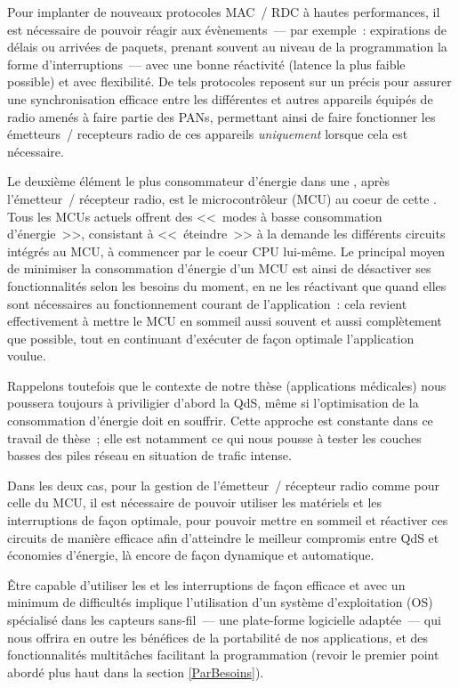 Pour implanter de nouveaux protocoles MAC~/ RDC à hautes performances,
il est nécessaire de pouvoir réagir aux évènements~--- par exemple~:
expirations de délais ou arrivées de paquets, prenant souvent au niveau
de la programmation la forme d'interruptions~--- avec une bonne réactivité
(latence la plus faible possible) et avec flexibilité. De tels protocoles
reposent sur un  précis pour assurer une synchronisation
efficace entre les différentes  et autres appareils équipés
de radio amenés à faire partie des PANs, permettant ainsi de faire
fonctionner les émetteurs~/ recepteurs radio de ces appareils
\emph{uniquement} lorsque cela est nécessaire.

Le deuxième élément le plus consommateur d'énergie dans une ,
après l'émetteur~/ récepteur radio, est le microcontrôleur (MCU) au coeur
de cette . Tous les MCUs actuels offrent des <<~modes à basse
consommation d'énergie~>>, consistant à <<~éteindre~>> à la demande les
différents circuits intégrés au MCU, à commencer par le coeur CPU lui-même.
Le principal moyen de minimiser la consommation d'énergie d'un MCU est ainsi
de désactiver ses fonctionnalités selon les besoins du moment, en ne les
réactivant que quand elles sont nécessaires au fonctionnement courant de
l'application~: cela revient effectivement à mettre le MCU en sommeil
aussi souvent et aussi complètement que possible, tout en continuant
d'exécuter de façon optimale l'application voulue.

Rappelons toutefois que le contexte de notre thèse (applications médicales)
nous poussera toujours à priviligier d'abord la QdS, même si l'optimisation
de la consommation d'énergie doit en souffrir. Cette approche est constante
dans ce travail de thèse~; elle est notamment ce qui nous pousse à tester
les couches basses des piles réseau en situation de trafic intense.
 
Dans les deux cas, pour la gestion de l'émetteur~/ récepteur radio comme
pour celle du MCU, il est nécessaire de pouvoir utiliser les 
matériels et les interruptions de façon optimale, pour pouvoir mettre en
sommeil et réactiver ces circuits de manière efficace afin d'atteindre
le meilleur compromis entre QdS et économies d'énergie, là encore
de façon dynamique et automatique.

\newpage

Être capable d'utiliser les  et les interruptions de façon
efficace et avec un minimum de difficultés implique l'utilisation d'un
système d'exploitation (OS) spécialisé dans les capteurs sans-fil~--- une
plate-forme logicielle adaptée~--- qui nous offrira en outre les bénéfices
de la portabilité de nos applications, et des fonctionnalités
multitâches facilitant la programmation (revoir le premier point abordé
plus haut dans la section \vref{ParBesoins}).

